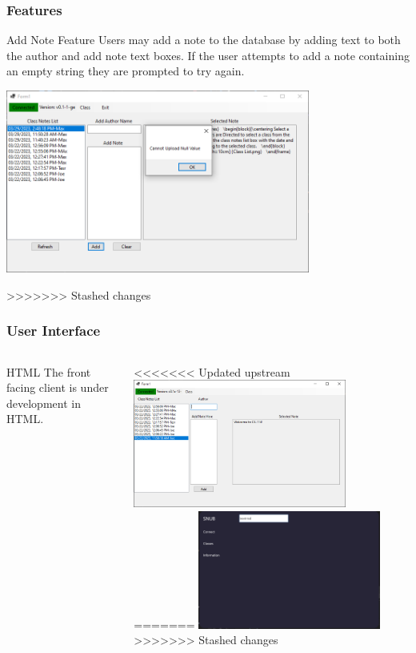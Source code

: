 \documentclass[aspectratio=169]{beamer}
\begin{document}
\begin{frame}
    \frametitle{Features}

    \begin{block}{\centering Add Note Feature}
        \centering Users may add a note to the database by adding text to both the author and add note text boxes. If the user attempts to add a note containing an empty string they are prompted to try again.
    \end{block}

    \centering \includegraphics [width=10cm] {Add Note.png}
    
>>>>>>> Stashed changes
\end{frame}

\begin{frame}
    \frametitle{User Interface}

    \begin{columns}
        \begin{column}{0.48\textwidth}
            \begin{block}{HTML}
                The front facing client is under development in HTML.
            \end{block}
        \end{column}
        \begin{column}{0.48\textwidth}
<<<<<<< Updated upstream
            \includegraphics[width=7cm]{Sample_of_Features}
=======
            \includegraphics[width=6cm]{WpfBluePrint.PNG}
>>>>>>> Stashed changes
        \end{column}
    \end{columns}

\end{frame}
\end{document}
